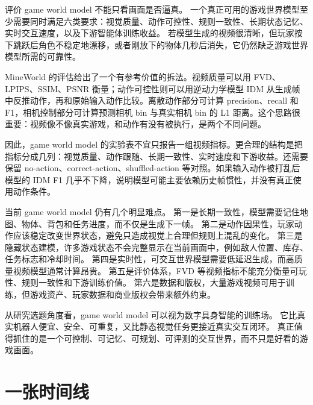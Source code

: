 \documentclass[11pt,a4paper]{ctexart}
\begin{document}
评价 game world model 不能只看画面是否逼真。
一个真正可用的游戏世界模型至少需要同时满足六类要求：视觉质量、动作可控性、规则一致性、长期状态记忆、实时交互速度，以及下游智能体训练收益。
若模型生成的视频很清晰，但玩家按下跳跃后角色不稳定地漂移，或者刚放下的物体几秒后消失，它仍然缺乏游戏世界模型所需的可靠性。

MineWorld 的评估给出了一个有参考价值的拆法。视频质量可以用 FVD、LPIPS、SSIM、PSNR 衡量；动作可控性则可以用逆动力学模型 IDM 从生成帧中反推动作，再和原始输入动作比较。离散动作部分可计算 precision、recall 和 F1，相机控制部分可计算预测相机 bin 与真实相机 bin 的 L1 距离。这个思路很重要：视频像不像真实游戏，和动作有没有被执行，是两个不同问题。

因此，game world model 的实验表不宜只报告一组视频指标。更合理的结构是把指标分成几列：视觉质量、动作跟随、长期一致性、实时速度和下游收益。还需要保留 no-action、correct-action、shuffled-action 等对照。如果输入动作被打乱后模型的 IDM F1 几乎不下降，说明模型可能主要依赖历史帧惯性，并没有真正使用动作条件。

当前 game world model 仍有几个明显难点。
第一是长期一致性，模型需要记住地图、物体、背包和任务进度，而不仅是生成下一帧。
第二是动作因果性，玩家动作应该稳定改变世界状态，避免只造成视觉上合理但规则上混乱的变化。
第三是隐藏状态建模，许多游戏状态不会完整显示在当前画面中，例如敌人位置、库存、任务标志和冷却时间。
第四是实时性，可交互世界模型需要低延迟生成，而高质量视频模型通常计算昂贵。
第五是评价体系，FVD 等视频指标不能充分衡量可玩性、规则一致性和下游训练价值。
第六是数据和版权，大量游戏视频可用于训练，但游戏资产、玩家数据和商业版权会带来额外约束。

从研究选题角度看，game world model 可以视为数字具身智能的训练场。
它比真实机器人便宜、安全、可重复，又比静态视觉任务更接近真实交互闭环。
真正值得抓住的是一个可控制、可记忆、可规划、可评测的交互世界，而不只是好看的游戏画面。

\section{一张时间线}
\end{document}
